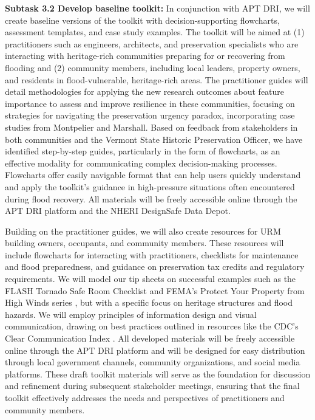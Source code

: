 \documentclass[11pt]{article}
\begin{document}
\textbf{Subtask 3.2 Develop baseline toolkit:}
In conjunction with APT DRI, we will create baseline versions of the toolkit with decision-supporting flowcharts, assessment templates, and case study examples. 
The toolkit will be aimed at (1) practitioners such as engineers, architects, and preservation specialists who are interacting with heritage-rich communities preparing for or recovering from flooding and (2) community members, including local leaders, property owners, and residents in flood-vulnerable, heritage-rich areas. 
The practitioner guides will detail methodologies for applying the new research outcomes about feature importance to assess and improve resilience in these communities, focusing on strategies for navigating the preservation urgency paradox, incorporating case studies from Montpelier and Marshall.
Based on feedback from stakeholders in both communities and the Vermont State Historic Preservation Officer, we have identified step-by-step guides, particularly in the form of flowcharts, as an effective modality for communicating complex decision-making processes. 
Flowcharts offer easily navigable format that can help users quickly understand and apply the toolkit's guidance in high-pressure situations often encountered during flood recovery.
All materials will be freely accessible online through the APT DRI platform and the NHERI DesignSafe Data Depot.

Building on the practitioner guides, we will also create resources for URM building owners, occupants, and community members. 
These resources will include flowcharts for interacting with practitioners, checklists for maintenance and flood preparedness, and guidance on preservation tax credits and regulatory requirements.
We will model our tip sheets on successful examples such as the FLASH Tornado Safe Room Checklist \cite{FLASH-SafeRoomChecklist} and FEMA's Protect Your Property from High Winds series \cite{FEMA-ProtectYourProperty}, but with a specific focus on heritage structures and flood hazards. 
We will employ principles of information design and visual communication, drawing on best practices outlined in resources like the CDC's Clear Communication Index \cite{CDC-CCI}.
All developed materials will be freely accessible online through the APT DRI platform and will be designed for easy distribution through local government channels, community organizations, and social media platforms. These draft toolkit materials will serve as the foundation for discussion and refinement during subsequent stakeholder meetings, ensuring that the final toolkit effectively addresses the needs and perspectives of practitioners and community members.
\end{document}
